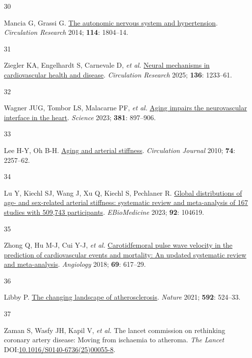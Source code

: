 \documentclass[
  a4paper,
  headsepline=true,
  open=left]{scrbook}
\newlength{\cslhangindent}
\newlength{\csllabelwidth}
\newlength{\cslentryspacingunit} %
\newenvironment{CSLReferences}[2] %
 {%
  \setlength{\parindent}{0pt}
  \ifodd #1
  \let\oldpar\par
  \def\par{\hangindent=\cslhangindent\oldpar}
  \fi
  \setlength{\parskip}{#2\cslentryspacingunit}
 }%
 {}
\newcommand{\CSLLeftMargin}[1]{\parbox[t]{\csllabelwidth}{#1}}
\newcommand{\CSLRightInline}[1]{\parbox[t]{\linewidth - \csllabelwidth}{#1}\break}
\begin{document}
\begin{CSLReferences}{0}{0}
\leavevmode{}%
\CSLLeftMargin{30 }%
\CSLRightInline{Mancia G, Grassi G.
\href{https://doi.org/10.1161/CIRCRESAHA.114.302524}{The autonomic
nervous system and hypertension}. \emph{Circulation Research} 2014;
\textbf{114}: 1804--14.}

\leavevmode{}%
\CSLLeftMargin{31 }%
\CSLRightInline{Ziegler KA, Engelhardt S, Carnevale D, \emph{et al.}
\href{https://doi.org/10.1161/CIRCRESAHA.125.325580}{Neural mechanisms
in cardiovascular health and disease}. \emph{Circulation Research} 2025;
\textbf{136}: 1233--61.}

\leavevmode{}%
\CSLLeftMargin{32 }%
\CSLRightInline{Wagner JUG, Tombor LS, Malacarne PF, \emph{et al.}
\href{https://doi.org/10.1126/science.ade4961}{Aging impairs the
neurovascular interface in the heart}. \emph{Science} 2023;
\textbf{381}: 897--906.}

\leavevmode{}%
\CSLLeftMargin{33 }%
\CSLRightInline{Lee H-Y, Oh B-H.
\href{https://doi.org/10.1253/circj.CJ-10-0910}{Aging and arterial
stiffness}. \emph{Circulation Journal} 2010; \textbf{74}: 2257--62.}

\leavevmode{}%
\CSLLeftMargin{34 }%
\CSLRightInline{Lu Y, Kiechl SJ, Wang J, Xu Q, Kiechl S, Pechlaner R.
\href{https://doi.org/10.1016/j.ebiom.2023.104619}{Global distributions
of age- and sex-related arterial stiffness: systematic review and
meta-analysis of 167 studies with 509,743 participants}.
\emph{EBioMedicine} 2023; \textbf{92}: 104619.}

\leavevmode{}%
\CSLLeftMargin{35 }%
\CSLRightInline{Zhong Q, Hu M-J, Cui Y-J, \emph{et al.}
\href{https://doi.org/10.1177/0003319717742544}{Carotid{\textendash}femoral
pulse wave velocity in the prediction of cardiovascular events and
mortality: An updated systematic review and meta-analysis}.
\emph{Angiology} 2018; \textbf{69}: 617--29.}

\leavevmode{}%
\CSLLeftMargin{36 }%
\CSLRightInline{Libby P.
\href{https://doi.org/10.1038/s41586-021-03392-8}{The changing landscape
of atherosclerosis}. \emph{Nature} 2021; \textbf{592}: 524--33.}

\leavevmode{}%
\CSLLeftMargin{37 }%
\CSLRightInline{Zaman S, Wasfy JH, Kapil V, \emph{et al.} The lancet
commission on rethinking coronary artery disease: Moving from ischaemia
to atheroma. \emph{The Lancet}
DOI:\href{https://doi.org/10.1016/S0140-6736(25)00055-8}{10.1016/S0140-6736(25)00055-8}.}


\end{CSLReferences}
\end{document}
